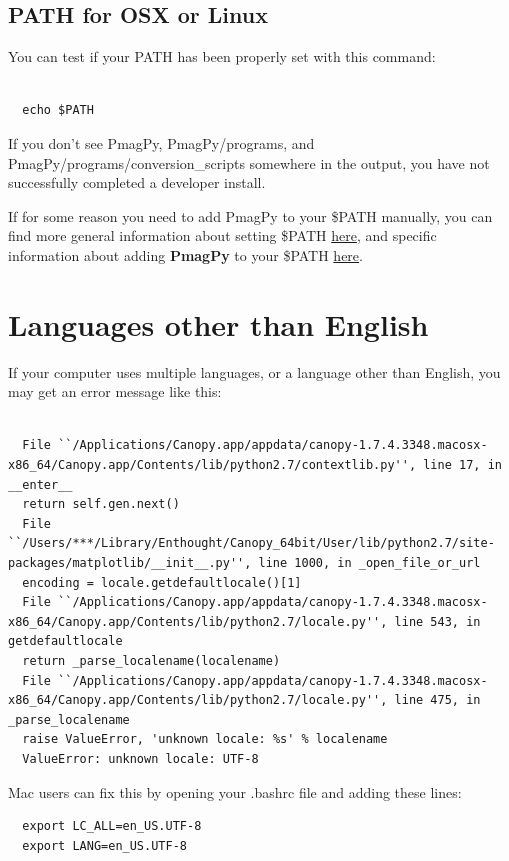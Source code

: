\documentclass[11pt]{book}
\begin{document}
{{\subsection{PATH for OSX or Linux}
You can test if your PATH has been properly set with this command:\begin{verbatim}

  echo $PATH

\end{verbatim}

If you don't see PmagPy, PmagPy/programs, and PmagPy/programs/conversion\_scripts somewhere in the output, you have not successfully completed a developer install.

If for some reason you need to add PmagPy to your \$PATH manually, you can find more general information about setting \$PATH \href{https://stackoverflow.com/questions/14637979/how-to-permanently-set-path-on-linux-unix}{here}, and specific information about adding {\bf PmagPy} to your \$PATH \href{#setting_path}{here}.


\section{Languages other than English}
  If your computer uses multiple languages, or a language other than English, you may get an error message like this:
  \begin{verbatim}

  File ``/Applications/Canopy.app/appdata/canopy-1.7.4.3348.macosx-x86_64/Canopy.app/Contents/lib/python2.7/contextlib.py'', line 17, in __enter__
  return self.gen.next()
  File ``/Users/***/Library/Enthought/Canopy_64bit/User/lib/python2.7/site-packages/matplotlib/__init__.py'', line 1000, in _open_file_or_url
  encoding = locale.getdefaultlocale()[1]
  File ``/Applications/Canopy.app/appdata/canopy-1.7.4.3348.macosx-x86_64/Canopy.app/Contents/lib/python2.7/locale.py'', line 543, in getdefaultlocale
  return _parse_localename(localename)
  File ``/Applications/Canopy.app/appdata/canopy-1.7.4.3348.macosx-x86_64/Canopy.app/Contents/lib/python2.7/locale.py'', line 475, in _parse_localename
  raise ValueError, 'unknown locale: %s' % localename
  ValueError: unknown locale: UTF-8
  \end{verbatim}
  Mac users can fix this by opening your .bashrc file and adding these lines:
  \begin{verbatim}
  export LC_ALL=en_US.UTF-8
  export LANG=en_US.UTF-8
  \end{verbatim}

}}
\end{document}
